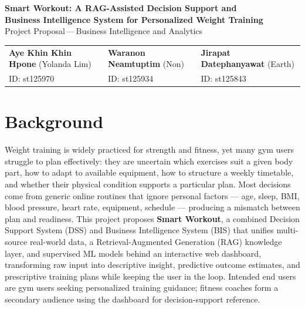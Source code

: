 \documentclass[10pt,a4paper]{article}
\begin{document}
\begin{center}
{\Large\bfseries Smart Workout: A RAG-Assisted Decision Support and \\[2pt]
Business Intelligence System for Personalized Weight Training}\\[6pt]
{\normalsize Project Proposal\,---\,Business Intelligence and Analytics}
\end{center}

\begin{center}
\small
\begin{tabular}{lll}
\textbf{Aye Khin Khin Hpone} (Yolanda Lim) & \textbf{Waranon Neamtuptim} (Non) & \textbf{Jirapat Datephanyawat} (Earth) \\
ID: st125970 & ID: st125934 & ID: st125843 \\
\end{tabular}
\end{center}

\section{Background}
Weight training is widely practiced for strength and fitness, yet many gym users struggle to plan effectively: they are uncertain which exercises suit a given body part, how to adapt to available equipment, how to structure a weekly timetable, and whether their physical condition supports a particular plan. Most decisions come from generic online routines that ignore personal factors --- age, sleep, BMI, blood pressure, heart rate, equipment, schedule --- producing a mismatch between plan and readiness. This project proposes \textbf{Smart Workout}, a combined Decision Support System (DSS) and Business Intelligence System (BIS) that unifies multi-source real-world data, a Retrieval-Augmented Generation (RAG) knowledge layer, and supervised ML models behind an interactive web dashboard, transforming raw input into descriptive insight, predictive outcome estimates, and prescriptive training plans while keeping the user in the loop. Intended end users are gym users seeking personalized training guidance; fitness coaches form a secondary audience using the dashboard for decision-support reference.

\end{document}

